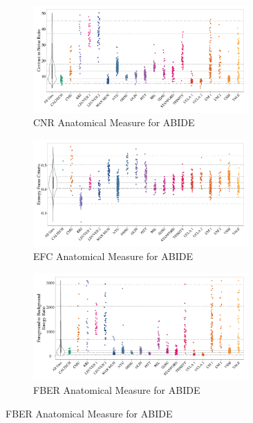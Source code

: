 \documentclass{frontiersSCNS} %
\begin{document}
\begin{figure}[!ht]
  \centering
     \begin{subfigure}[b]{0.9\textwidth}
       \includegraphics[width=0.9\textwidth]{fig1_ABIDE_Anatomical_cnr}
       \caption{CNR Anatomical Measure for ABIDE}
     \end{subfigure}
     \begin{subfigure}[b]{0.9\textwidth}
       \includegraphics[width=0.9\textwidth]{fig1_ABIDE_Anatomical_efc}
       \caption{EFC Anatomical Measure for ABIDE}
     \end{subfigure}
     \begin{subfigure}[b]{0.9\textwidth}
       \includegraphics[width=0.9\textwidth]{fig1_ABIDE_Anatomical_fber}
       \caption{FBER Anatomical Measure for ABIDE}
     \end{subfigure}

\end{figure}
\end{document}
